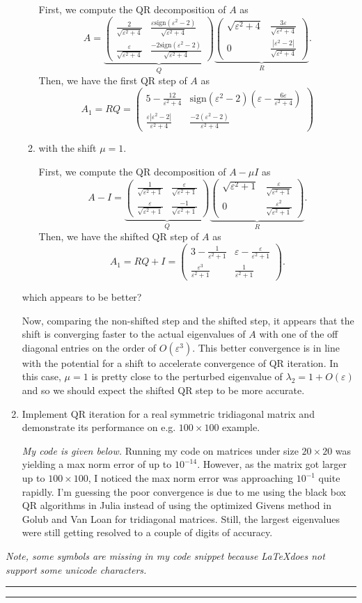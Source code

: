 \documentclass[a4paper,12pt]{article}
\newcommand{\eps}{\varepsilon}
\newcommand{\abs}[1]{\left| #1 \right|}
\newcommand{\sign}{\mathrm{sign}}
\newcommand{\pmat}[1]{\begin{pmatrix} #1 \end{pmatrix}}
\begin{document}
\begin{enumerate}[label = (\arabic*)]
\begin{enumerate}[label = (\alph*)]
		First, we compute the QR decomposition of $ A $ as
		\[
			A = 
			\underbrace{\pmat{
				\frac{2}{\sqrt{\eps^2 + 4}} & \frac{\eps \sign(\eps^2 - 2)}{\sqrt{\eps^2 + 4}} \\
				\frac{\eps}{\sqrt{\eps^2 + 4}} & \frac{-2 \sign(\eps^2 - 2)}{\sqrt{\eps^2 + 4}}
			}}_Q \underbrace{\pmat{
				\sqrt{\eps^2 + 4} & \frac{3 \eps}{\sqrt{\eps^2 + 4}} \\
				0 & \frac{\abs{\eps^2 - 2}}{\sqrt{\eps^2 + 4}}
			}}_R.
		\]
		Then, we have the first QR step of $ A $ as
		\[
			A_1 = R Q = 
			\pmat{
				5 - \frac{12}{\eps^2 + 4} & \sign(\eps^2 - 2) \left(\eps - \frac{6\eps}{\eps^2 + 4}\right)\\
				\frac{\eps \abs{\eps^2 - 2}}{\eps^2 + 4} & \frac{-2 (\eps^2 - 2)}{\eps^2 + 4}
			}
		\]
		
		\item with the shift $ \mu = 1 $.
		
		First, we compute the QR decomposition of $ A - \mu I $ as
		\[
			A - I = 
			\underbrace{\pmat{
				\frac{1}{\sqrt{\eps^2 + 1}} & \frac{\eps}{\sqrt{\eps^2 + 1}} \\
				\frac{\eps}{\sqrt{\eps^2 + 1}} & \frac{-1}{\sqrt{\eps^2 + 1}}
			}}_Q \underbrace{\pmat{
				\sqrt{\eps^2 + 1} & \frac{\eps}{\sqrt{\eps^2 + 1}} \\
				0 & \frac{\eps^2}{\sqrt{\eps^2 + 1}}}}_R.
		\]
		Then, we have the shifted QR step of $ A $ as
		\[
			A_1 = RQ + I = 
			\pmat{
				3 - \frac{1}{\eps^2 + 1} & \eps - \frac{\eps}{\eps^2 + 1} \\
				\frac{\eps^3}{\eps^2 + 1} & \frac{1}{\eps^2 + 1}
			}.
		\]
	\end{enumerate}
	which appears to be better?
	
	Now, comparing the non-shifted step and the shifted step, it appears that the shift is converging faster to the actual eigenvalues of $ A $ with one of the off diagonal entries on the order of $ O(\eps^3) $. This better convergence is in line with the potential for a shift to accelerate convergence of QR iteration. In this case, $ \mu = 1 $ is pretty close to the perturbed eigenvalue of $ \lambda_2 = 1 + O(\eps) $ and so we should expect the shifted QR step to be more accurate.
	
	\newpage
	\item Implement QR iteration for a real symmetric tridiagonal matrix and demonstrate its performance on e.g. $ 100 \times 100 $ example.
	
	\emph{My code is given below.} Running my code on matrices under size $ 20 \times 20 $ was yielding a max norm error of up to $ 10^{-14} $. However, as the matrix got larger up to $ 100 \times 100 $, I noticed the max norm error was approaching $ 10^{-1} $ quite rapidly. I'm guessing the poor convergence is due to me using the black box QR algorithms in Julia instead of using the optimized Givens method in Golub and Van Loan for tridiagonal matrices. Still, the largest eigenvalues were still getting resolved to a couple of digits of accuracy.
\end{enumerate}

\emph{Note, some symbols are missing in my code snippet because \LaTeX does not support some unicode characters.}

\rule{\textwidth}{.4pt}
	
\rule{\textwidth}{.4pt}
\end{document}
